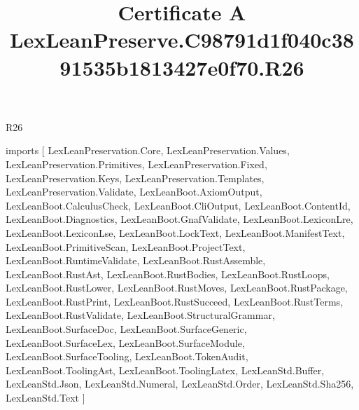 \begin{lexlean}{R26}
\title{Certificate A LexLeanPreserve.C98791d1f040c3891535b1813427e0f70.R26}
\begin{coremodule}
imports [
  LexLeanPreservation.Core,
  LexLeanPreservation.Values,
  LexLeanPreservation.Primitives,
  LexLeanPreservation.Fixed,
  LexLeanPreservation.Keys,
  LexLeanPreservation.Templates,
  LexLeanPreservation.Validate,
  LexLeanBoot.AxiomOutput,
  LexLeanBoot.CalculusCheck,
  LexLeanBoot.CliOutput,
  LexLeanBoot.ContentId,
  LexLeanBoot.Diagnostics,
  LexLeanBoot.GnafValidate,
  LexLeanBoot.LexiconLre,
  LexLeanBoot.LexiconLse,
  LexLeanBoot.LockText,
  LexLeanBoot.ManifestText,
  LexLeanBoot.PrimitiveScan,
  LexLeanBoot.ProjectText,
  LexLeanBoot.RuntimeValidate,
  LexLeanBoot.RustAssemble,
  LexLeanBoot.RustAst,
  LexLeanBoot.RustBodies,
  LexLeanBoot.RustLoops,
  LexLeanBoot.RustLower,
  LexLeanBoot.RustMoves,
  LexLeanBoot.RustPackage,
  LexLeanBoot.RustPrint,
  LexLeanBoot.RustSucceed,
  LexLeanBoot.RustTerms,
  LexLeanBoot.RustValidate,
  LexLeanBoot.StructuralGrammar,
  LexLeanBoot.SurfaceDoc,
  LexLeanBoot.SurfaceGeneric,
  LexLeanBoot.SurfaceLex,
  LexLeanBoot.SurfaceModule,
  LexLeanBoot.SurfaceTooling,
  LexLeanBoot.TokenAudit,
  LexLeanBoot.ToolingAst,
  LexLeanBoot.ToolingLatex,
  LexLeanStd.Buffer,
  LexLeanStd.Json,
  LexLeanStd.Numeral,
  LexLeanStd.Order,
  LexLeanStd.Sha256,
  LexLeanStd.Text
]


\end{coremodule}
\end{lexlean}
